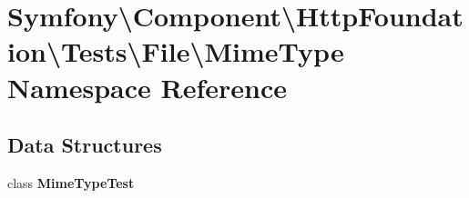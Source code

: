\section{Symfony\textbackslash{}Component\textbackslash{}Http\+Foundation\textbackslash{}Tests\textbackslash{}File\textbackslash{}Mime\+Type Namespace Reference}
\label{namespace_symfony_1_1_component_1_1_http_foundation_1_1_tests_1_1_file_1_1_mime_type}
\subsection*{Data Structures}
\begin{DoxyCompactItemize}
\item 
class {\bf Mime\+Type\+Test}
\end{DoxyCompactItemize}
